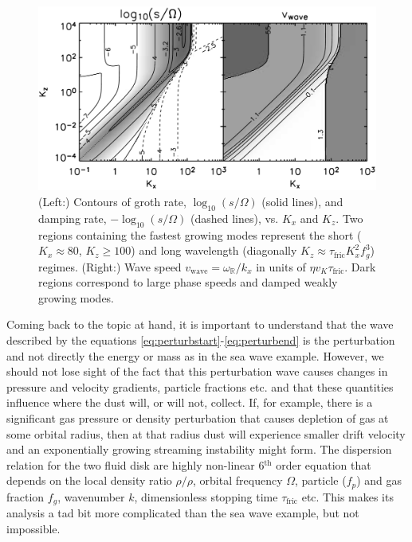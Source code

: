 \documentclass[12pt]{article}
\begin{document}
\begin{figure}[htbp]
    \label{fig:shortwave}
    \centering
    \includegraphics[width=0.7\linewidth]{images/shortwave.png}
    \caption{(Left:) Contours of groth rate, $\log_{10}(s/\Omega)$ (solid lines), and damping rate, $-\log_{10}(s/\Omega)$ (dashed lines), vs. $K_x$ and $K_z$. Two regions containing the fastest growing modes represent the short ($K_x\approx 80$, $K_z\ge100$) and long wavelength (diagonally $K_z\approx\tau_\mathrm{fric}K_x^2f_g^3$) regimes. (Right:) Wave speed $v_\mathrm{wave}=\omega_\mathbb{R}/k_x$ in units of $\eta v_K \tau_\mathrm{fric}$. Dark regions correspond to large phase speeds and damped weakly growing modes. }
\end{figure}

Coming back to the topic at hand, it is important to understand that the wave described by the equations \ref{eq:perturbstart}-\ref{eq:perturbend} is the perturbation and not directly the energy or mass as in the sea wave example. However, we should not lose sight of the fact that this perturbation wave causes changes in pressure and velocity gradients, particle fractions etc. and that these quantities influence where the dust will, or will not, collect. If, for example, there is a significant gas pressure or density perturbation that causes depletion of gas at some orbital radius, then at that radius dust will experience smaller drift velocity and an exponentially growing streaming instability might form. The dispersion relation for the two fluid disk are highly non-linear  6$^{\mathrm{th}}$ order equation that depends on the local density ratio $\rho/\rho$, orbital frequency $\Omega$, particle ($f_p$) and gas fraction $f_g$, wavenumber $k$, dimensionless stopping time $\tau_\mathrm{fric}$ etc. This makes its analysis a tad bit more complicated than the sea wave example, but not impossible. 
\end{document}
